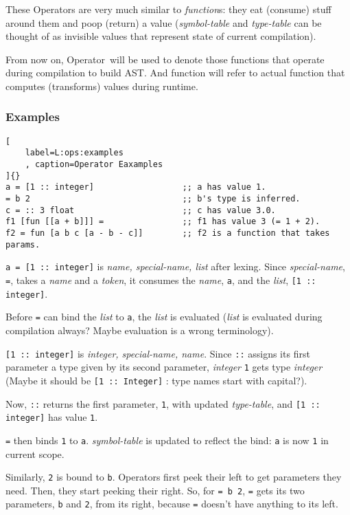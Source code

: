 \documentclass[12pt,letterpaper,notitlepage]{article}
\newcommand{\op}{Operator}
\begin{document}
These \op s are very much similar to \emph{function}s:
they eat (consume) stuff around them and poop (return) a value
(\emph{symbol-table} and \emph{type-table} can be thought of as
invisible values that represent state of current compilation).

From now on, \op\ will be used to denote those functions that
operate during compilation to build AST. And function will refer to
actual function that computes (transforms) values during runtime.

\subsubsection{Examples}
\label{S:ops:examples}

\begin{lstlisting}[
    label=L:ops:examples
    , caption=Operator Eaxamples
]{}
a = [1 :: integer]                  ;; a has value 1.
= b 2                               ;; b's type is inferred.
c = :: 3 float                      ;; c has value 3.0.
f1 [fun [[a + b]]] =                ;; f1 has value 3 (= 1 + 2).
f2 = fun [a b c [a - b - c]]        ;; f2 is a function that takes params.
\end{lstlisting}
\verb!a = [1 :: integer]! is \emph{name, special-name, list} after
lexing. Since \emph{special-name}, \verb!=!, takes a \emph{name}
and a \emph{token}, it consumes the \emph{name}, \verb!a!, and
the \emph{list}, \verb![1 :: integer]!.

Before \verb!=! can bind the \emph{list} to \verb!a!,
the \emph{list} is evaluated (\emph{list} is evaluated during
compilation always? Maybe evaluation is a wrong terminology).

\verb![1 :: integer]! is \emph{integer, special-name, name}.
Since \verb!::! assigns its first parameter a type given by its second
parameter, \emph{integer} \verb!1! gets type \emph{integer}
(Maybe it should be \verb![1 :: Integer]! : type names start with capital?).

Now, \verb!::! returns the first parameter, \verb!1!, with updated
\emph{type-table}, and \verb![1 :: integer]! has value \verb!1!.

\verb!=! then binds \verb!1! to \verb!a!. \emph{symbol-table}
is updated to reflect the bind: \verb!a! is now \verb!1! in current scope.

Similarly, \verb!2! is bound to \verb!b!.
\op s first peek their left to get parameters they need.
Then, they start peeking their right.
So, for \verb!= b 2!, \verb!=! gets its two parameters, \verb!b! and \verb!2!,
from its right, because \verb!=! doesn't have anything to its left.
\end{document}
